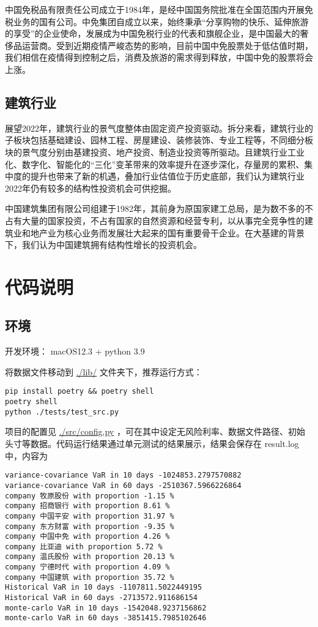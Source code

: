 \documentclass[a4paper,12pt]{ctexart}
\begin{document}
中国免税品有限责任公司成立于1984年，是经中国国务院批准在全国范围内开展免税业务的国有公司。中免集团自成立以来，始终秉承“分享购物的快乐、延伸旅游的享受”的企业使命，发展成为中国免税行业的代表和旗舰企业，是中国最大的奢侈品运营商。受到近期疫情严峻态势的影响，目前中国中免股票处于低估值时期，我们相信在疫情得到控制之后，消费及旅游的需求得到释放，中国中免的股票将会上涨。

\subsection{建筑行业}
\label{sec:orgb7ee309}
展望2022年，建筑行业的景气度整体由固定资产投资驱动。拆分来看，建筑行业的子板块包括基础建设、园林工程、房屋建设、装修装饰、专业工程等，不同细分板块的景气度分别由基建投资、地产投资、制造业投资等所驱动。且建筑行业工业化、数字化、智能化的“三化”变革带来的效率提升在逐步深化，存量房的累积、集中度的提升也带来了新的机遇，叠加行业估值位于历史底部，我们认为建筑行业2022年仍有较多的结构性投资机会可供挖掘。

中国建筑集团有限公司组建于1982年，其前身为原国家建工总局，是为数不多的不占有大量的国家投资，不占有国家的自然资源和经营专利，以从事完全竞争性的建筑业和地产业为核心业务而发展壮大起来的国有重要骨干企业。在大基建的背景下，我们认为中国建筑拥有结构性增长的投资机会。
\section{代码说明}
\label{sec:org9154238}
\subsection{环境}
\label{sec:org4f6cb81}

开发环境： macOS12.3 + python 3.9

将数据文件移动到 \url{./lib/} 文件夹下，推荐运行方式：
\begin{verbatim}
pip install poetry && poetry shell
poetry shell
python ./tests/test_src.py
\end{verbatim}
项目的配置见 \url{./src/config.py} ，可在其中设定无风险利率、数据文件路径、初始头寸等数据。代码运行结果通过单元测试的结果展示，结果会保存在 result.log 中，内容为

\begin{verbatim}
variance-covariance VaR in 10 days -1024853.2797570882
variance-covariance VaR in 60 days -2510367.5966226864
company 牧原股份 with proportion -1.15 %
company 招商银行 with proportion 8.61 %
company 中国平安 with proportion 31.97 %
company 东方财富 with proportion -9.35 %
company 中国中免 with proportion 4.26 %
company 比亚迪 with proportion 5.72 %
company 温氏股份 with proportion 20.13 %
company 宁德时代 with proportion 4.09 %
company 中国建筑 with proportion 35.72 %
Historical VaR in 10 days -1107811.5022449195
Historical VaR in 60 days -2713572.911686154
monte-carlo VaR in 10 days -1542048.9237156862
monte-carlo VaR in 60 days -3851415.7985102646
\end{verbatim}
\end{document}

